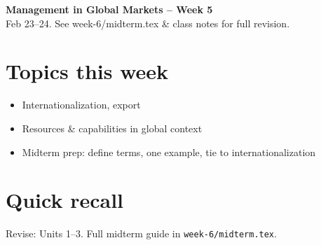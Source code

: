 \documentclass[10pt,a4paper]{article}
\begin{document}
\begin{center}
{\large\bfseries\color{eublue} Management in Global Markets -- Week 5}\\[0.2em]
\footnotesize Feb 23--24. See week-6/midterm.tex \& class notes for full revision.
\end{center}\vspace{0.5em}

\section*{\color{eublue}Topics this week}
\begin{itemize}
\item Internationalization, export
\item Resources \& capabilities in global context
\item Midterm prep: define terms, one example, tie to internationalization
\end{itemize}

\section*{Quick recall}
Revise: Units 1--3. Full midterm guide in \texttt{week-6/midterm.tex}.
\end{document}
